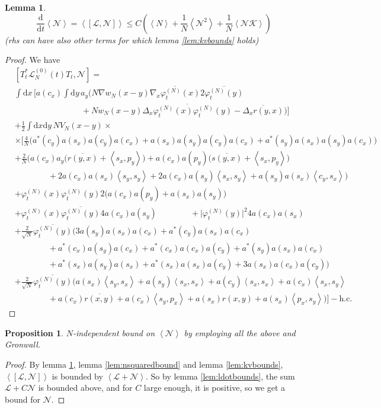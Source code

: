 \documentclass[11pt,a4paper]{scrartcl} %
\newtheorem{prp}[thm]{Proposition}
\newtheorem{lem}[thm]{Lemma}
\newcommand{\di}{\textrm{d}}		%
\newcommand{\Lcal}{\mathcal{L}}		%
\newcommand{\Ncal}{\mathcal{N}}		%
\newcommand{\Kcal}{\mathcal{K}}		%
\newcommand{\hc}{\mbox{h.c.}}		%
\newcommand{\scal}[2]{\left<#1,#2\right>} %
\newcommand{\cc}[1]{\overline{#1}}	%
\newcommand{\ev}[1]{\left<#1\right>}	%
\newcommand{\ph}{\varphi_t^{(N)}}	%
\newcommand{\bd}{\begin{displaymath}}			%
\newcommand{\ed}{\end{displaymath}}
\begin{document}
\begin{lem}
\label{lem:lncommutatorbound}
 \bd
  \frac{\di}{\di t}\ev{\Ncal} = \ev{[\Lcal,\Ncal]} \leq C \left( \ev{N} + \frac{1}{N}\ev{\Ncal^2} + \frac{1}{N} \ev{\Ncal \Kcal} \right)
 \ed
(rhs can have also other terms for which lemma \ref{lem:kvbounds} holds)
\end{lem}
\begin{proof}
We have
\begin{align*}
& [T^*_t \Lcal_N^{(0)}(t) T_t,\Ncal] = \\ 
& \int \di x\, \bigg[ a(c_x) \int \di y\, a_y \Big( N \nabla w_N(x-y) \cc{\nabla_x \ph(x)} 2 \cc{\ph(y)} \\
& \qquad\qquad \qquad\qquad						+ Nw_N(x-y) \cc{\Delta_x \ph(x) \ph(y)} - \cc{\Delta_x r(y,x)} \Big) \bigg]\\
& + \frac{1}{2}\int \di x \di y\, NV_N(x-y) \times \\
& \times \Big[   \frac{4}{N}\bigg( a^*(c_y)a(s_x)a(c_y)a(c_x) + a(s_x)a(s_y)a(c_y)a(c_x) + a^*(s_y)a(s_x)a(s_y)a(c_x) \bigg) \\
& + \frac{2}{N}\bigg(  a(c_x) a_y \Big( \cc{r(y,x)} + \scal{s_x}{p_y} \Big) + a(c_x) a(p_y) \Big( \cc{s(y,x)} + \scal{s_x}{p_y} \Big) \\
			& \qquad\qquad + 2 a(c_x) a(s_x) \scal{s_y}{s_y} + 2 a(c_x)a(s_y) \scal{s_x}{s_y} + a(s_y) a(s_x) \scal{c_y}{s_x} \bigg)\\
& + \ph(x)\ph(y) 2\Big(  a(c_x) a(p_y) + a(s_x) a(s_y) \Big) \\
& + \ph(x) \cc{\ph(y)} 4 a(c_x) a(s_y) \qquad \qquad + \lvert \ph(y) \rvert^2 4 a(c_x) a(s_x) \\
& + \frac{2}{\sqrt{N}}\cc{\ph(y)} \bigg(   3 a(s_y)a(s_x)a(c_x) + a^*(c_y)a(s_x)a(c_x) \\
					    & \qquad\qquad + a^*(c_x)a(s_y)a(c_x) + a^*(c_x) a(c_x) a(c_y) + a^*(s_y) a(s_x) a(c_x)\\
					    & \qquad\qquad + a^*(s_x)a(s_y)a(s_x) + a^*(s_x) a(s_x) a(c_y) + 3 a(s_x) a(c_x) a(c_y) \bigg) \\
& + \frac{2}{\sqrt{N}}\cc{\ph(y)} \bigg(    a(s_x) \scal{s_y}{s_x} + a(s_y) \scal{s_x}{s_x}  + a(c_y) \scal{s_x}{s_x} + a(c_x) \scal{s_x}{s_y} \\
					    & \qquad\qquad + a(c_x)\cc{r(x,y)} + a(c_x)\scal{s_y}{p_x} + a(s_x)r(x,y) + a(s_x)\scal{p_x}{s_y}  \bigg)    \Big] - \hc
\end{align*}
\end{proof}


\begin{prp}
 $N$-independent bound on $\ev{\Ncal}$ by employing all the above and Gronwall.
\end{prp}
\begin{proof}
 By lemma \ref{lem:lncommutatorbound}, lemma \ref{lem:nsquaredbound} and lemma \ref{lem:kvbounds}, $\ev{[\Lcal,\Ncal]}$ is bounded by $\ev{\Lcal+\Ncal}$. So by lemma \ref{lem:ldotbounds}, the sum $\Lcal+C \Ncal$ is bounded above, and for $C$ large enough, it is positive, so we get a bound for $\Ncal$.
\end{proof}
\end{document}
